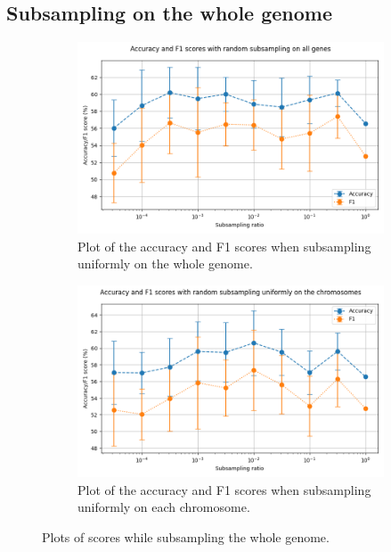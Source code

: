 \subsection{Subsampling on the whole genome}
\begin{figure}[ht!]
    \centering
    \begin{subfigure}[t]{0.48\textwidth}
    \centering
\includegraphics[width=\columnwidth]{figures/subsample_plot.png}
\caption{Plot of the accuracy and F1 scores when subsampling uniformly on the whole genome.}
\label{fig:res1a}
    \end{subfigure}
    \begin{subfigure}[t]{0.48\textwidth}
    \centering
\includegraphics[width=\columnwidth]{figures/uniform_sample_low_ratio.png}
\caption{Plot of the accuracy and F1 scores when subsampling uniformly on each chromosome.}
\label{fig:res1b}
    \end{subfigure}
\caption{Plots of scores while subsampling the whole genome.}
\label{fig:res1}
\end{figure}

